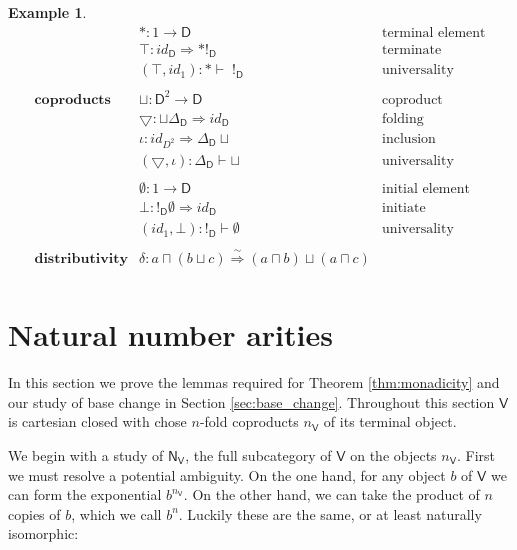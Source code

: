 \documentclass{amsart}
\theoremstyle{definition}
\newtheorem{example}[theorem]{Example}
\newcommand{\NN}{\mathsf{N}}
\newcommand{\V}{\mathsf{V}}
\newcommand{\D}{\mathsf{D}}
\newcommand{\maps}{\colon}
\begin{document}
\begin{example}
\[\begin{array}{lll}
                           & \ast\maps 1 \to \D & \text{terminal element}\\
                           & \top\maps id_\D\Longrightarrow \ast !_\D & \text{terminate}\\
                           & (\top,id_1)\maps \ast\vdash\; !_\D &  \text{universality}\\\\
            
        \textbf{coproducts} & \sqcup\maps \D^2 \to \D & \text{coproduct}\\
                       & \bigtriangledown\maps \sqcup\Delta_\D \Longrightarrow id_\D & \text{folding}\\
                       & \iota\maps id_{D^2}\Longrightarrow \Delta_\D\sqcup & \text{inclusion}\\
                           & (\bigtriangledown,\iota)\maps \Delta_\D \vdash \sqcup & \text{universality}\\\\

                           & \emptyset\maps 1\to \D & \text{initial element}\\
                           & \bot\maps !_\D\emptyset \Longrightarrow id_\D & \text{initiate}\\
                           & (id_1,\bot)\maps !_\D\vdash \emptyset & \text{universality}\\\\
            \textbf{distributivity} & \delta\maps a\sqcap(b\sqcup c) \stackrel{\sim}{\Longrightarrow} (a\sqcap b)\sqcup(a\sqcap c)\\
          \end{array}\]

\end{example}

\section{Natural number arities}

In this section we prove the lemmas required for Theorem \ref{thm:monadicity} and
our study of base change in Section \ref{sec:base_change}.  Throughout this section $\V$ is cartesian closed with chose $n$-fold coproducts $n_\V$ of its terminal object.  

We begin with a study of $\NN_\V$, the full subcategory of $\V$ on the objects $n_\V$.
First we must resolve a potential ambiguity.  On the one hand,
for any object $b$ of $\V$ we can form the exponential $b^{n_\V}$.   On the 
other hand, we can take the product of $n$ copies of $b$, which we call $b^n$.    
Luckily these are the same, or at least naturally isomorphic:
\end{document}

